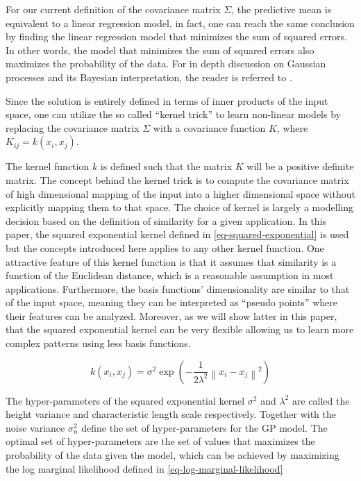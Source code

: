 \documentclass[useAMS,usenatbib,fleqn]{mn2e}
\begin{document}
For our current definition of the covariance matrix $\Sigma$, the predictive mean is equivalent to a linear regression model, in fact, one can reach the same conclusion by finding the linear regression model that minimizes the sum of squared errors. In other words, the model that minimizes the sum of squared errors also maximizes the probability of the data. For in depth discussion on Gaussian processes and its Bayesian interpretation, the reader is referred to \cite{}.

Since the solution is entirely defined in terms of inner products of the input space, one can utilize the so called ``kernel trick'' to learn non-linear models by replacing the covariance matrix $\Sigma$ with a covariance function $K$, where $K_{ij} = k(x_{i},x_{j})$.

The kernel function $k$ is defined such that the matrix $K$ will be a positive definite matrix. The concept behind the kernel trick is to compute the covariance matrix of high dimensional mapping of the input into a higher dimensional space without explicitly mapping them to that space. The choice of kernel is largely a modelling decision based on the definition of similarity for a given application. In this paper, the squared exponential kernel defined in \eqref{eq-squared-exponential} is used but the concepts introduced here applies to any other kernel function. One attractive feature of this kernel function is that it assumes that similarity is a function of the Euclidean distance, which is a reasonable assumption in most applications. Furthermore, the basis functions' dimensionality are similar to that of the input space, meaning they can be interpreted as ``pseudo points'' where their features can be analyzed. Moreover, as we will show latter in this paper, that the squared exponential kernel can be very flexible allowing us to learn more complex patterns using less basis functions.

\begin{equation}
\label{eq-squared-exponential}
k(x_{i},x_{j}) = \sigma^{2} \exp \left ( -\frac{1} {2\lambda^{2}} \left \|x_{i}-x_{j}\right\|^{2}\right )
\end{equation}

The hyper-parameters of the squared exponential kernel $\sigma^{2}$ and $\lambda^{2}$ are called the height variance and characteristic length scale respectively. Together with the noise variance $\sigma_{n}^{2}$ define the set of hyper-parameters for the GP model. The optimal set of hyper-parameters are the set of values that maximizes the probability of the data given the model, which can be achieved by maximizing the log marginal likelihood defined in \eqref{eq-log-marginal-likelihood} 
\end{document}
